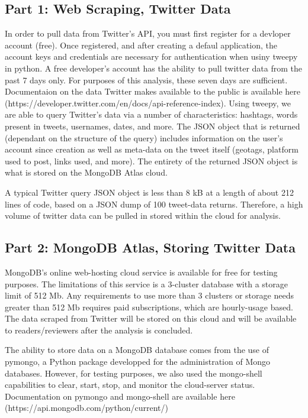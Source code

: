  \subsection{Part 1: Web Scraping, Twitter Data}

 In order to pull data from Twitter's API, you must first register for a devloper account (free). Once registered, and after creating a defaul application, the account keys and credentials are necessary for authentication when usiny tweepy in python. A free developer's account has the ability to pull twitter data from the past 7 days only. For purposes of this analysis, these seven days are sufficient. Documentaion on the data Twitter makes available to the public is available here (https://developer.twitter.com/en/docs/api-reference-index). Using tweepy, we are able to query Twitter's data via a number of characteristics: hashtags, words present in tweets, usernames, dates, and more. The JSON object that is returned (dependant on the structure of the query) includes information on the user's account since creation as well as meta-data on the tweet itself (geotags, platform used to post, links used, and more). The entirety of the returned JSON object is what is stored on the MongoDB Atlas cloud.

 A typical Twitter query JSON object is less than 8 kB at a length of about 212 lines of code, based on a JSON dump of 100 tweet-data returns. Therefore, a high volume of twitter data can be pulled in stored within the cloud for analysis.

 \subsection{Part 2: MongoDB Atlas, Storing Twitter Data}

 MongoDB's online web-hosting cloud service is available for free for testing purposes. The limitations of this service is a 3-cluster database with a storage limit of 512 Mb. Any requirements to use more than 3 clusters or storage needs greater than 512 Mb requires paid subscriptions, which are hourly-usage based. The data scraped from Twitter will be stored on this cloud and will be available to readers/reviewers after the analysis is concluded.

 The ability to store data on a MongoDB database comes from the use of pymongo, a Python package developped for the administration of Mongo databases. However, for testing purposes, we also used the mongo-shell capabilities to clear, start, stop, and monitor the cloud-server status. Documentation on pymongo and mongo-shell are available here (https://api.mongodb.com/python/current/)

